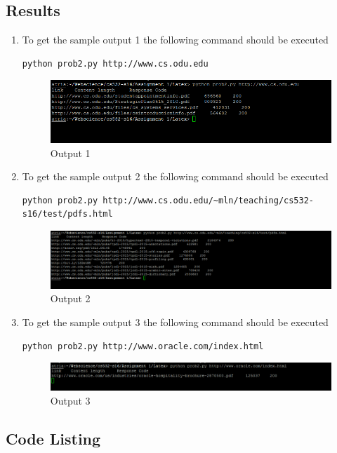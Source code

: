 \subsection{Results}
\begin{enumerate}
\item To get the sample output 1 the following command should be executed 
\begin{verbatim}
python prob2.py http://www.cs.odu.edu
\end{verbatim}
\begin{figure}[ht]    
    \begin{center}
        \includegraphics[scale=0.9]{sample_1.png}
        \caption{Output 1}
        \label{fig:X-distribution}
    \end{center}
\end{figure}
\newpage
\item To get the sample output 2 the following command should be executed 
\begin{verbatim}
python prob2.py http://www.cs.odu.edu/~mln/teaching/cs532-s16/test/pdfs.html
\end{verbatim}
\begin{figure}[ht]    
    \begin{center}
        \includegraphics[scale=0.9]{sample_2.png}
        \caption{Output 2}
        \label{fig:X-distribution}
    \end{center}
\end{figure}
\item To get the sample output 3 the following command should be executed 
\begin{verbatim}
python prob2.py http://www.oracle.com/index.html
\end{verbatim}

\begin{figure}[ht]    
    \begin{center}
        \includegraphics[scale=0.9]{sample_3.png}
        \caption{Output 3}
        \label{fig:X-distribution}
    \end{center}
\end{figure}
\end{enumerate}
\newpage
\subsection{Code Listing}
